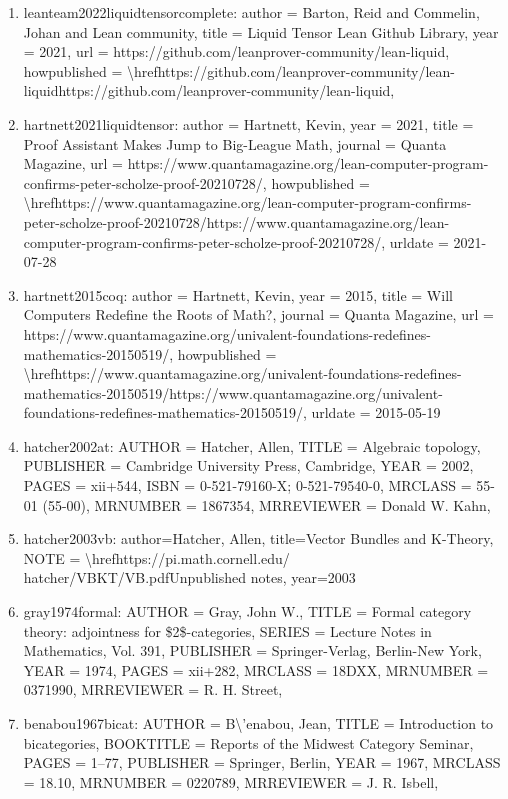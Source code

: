 \documentclass[11pt]{article}
\begin{document}
\begin{enumerate}[leftmargin=*]
  \item leanteam2022liquidtensorcomplete: author = Barton, Reid and Commelin, Johan and Lean community, title = Liquid Tensor Lean Github Library, year = 2021, url = https://github.com/leanprover-community/lean-liquid, howpublished = \textbackslash{}hrefhttps://github.com/leanprover-community/lean-liquidhttps://github.com/leanprover-community/lean-liquid,
  \item hartnett2021liquidtensor: author = Hartnett, Kevin, year = 2021, title = Proof Assistant Makes Jump to Big-League Math, journal = Quanta Magazine, url = https://www.quantamagazine.org/lean-computer-program-confirms-peter-scholze-proof-20210728/, howpublished = \textbackslash{}hrefhttps://www.quantamagazine.org/lean-computer-program-confirms-peter-scholze-proof-20210728/https://www.quantamagazine.org/lean-computer-program-confirms-peter-scholze-proof-20210728/, urldate = 2021-07-28
  \item hartnett2015coq: author = Hartnett, Kevin, year = 2015, title = Will Computers Redefine the Roots of Math?, journal = Quanta Magazine, url = https://www.quantamagazine.org/univalent-foundations-redefines-mathematics-20150519/, howpublished = \textbackslash{}hrefhttps://www.quantamagazine.org/univalent-foundations-redefines-mathematics-20150519/https://www.quantamagazine.org/univalent-foundations-redefines-mathematics-20150519/, urldate = 2015-05-19
  \item hatcher2002at: AUTHOR = Hatcher, Allen, TITLE = Algebraic topology, PUBLISHER = Cambridge University Press, Cambridge, YEAR = 2002, PAGES = xii+544, ISBN = 0-521-79160-X; 0-521-79540-0, MRCLASS = 55-01 (55-00), MRNUMBER = 1867354, MRREVIEWER = Donald W. Kahn,
  \item hatcher2003vb: author=Hatcher, Allen, title=Vector Bundles and K-Theory, NOTE = \textbackslash{}hrefhttps://pi.math.cornell.edu/ hatcher/VBKT/VB.pdfUnpublished notes, year=2003
  \item gray1974formal: AUTHOR = Gray, John W., TITLE = Formal category theory: adjointness for \$2\$-categories, SERIES = Lecture Notes in Mathematics, Vol. 391, PUBLISHER = Springer-Verlag, Berlin-New York, YEAR = 1974, PAGES = xii+282, MRCLASS = 18DXX, MRNUMBER = 0371990, MRREVIEWER = R. H. Street,
  \item benabou1967bicat: AUTHOR = B\textbackslash{}'enabou, Jean, TITLE = Introduction to bicategories, BOOKTITLE = Reports of the Midwest Category Seminar, PAGES = 1--77, PUBLISHER = Springer, Berlin, YEAR = 1967, MRCLASS = 18.10, MRNUMBER = 0220789, MRREVIEWER = J. R. Isbell,

\end{enumerate}
\end{document}
